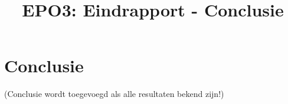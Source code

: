 \documentclass{scrartcl} %
\author{}
\title{EPO3: Eindrapport - Conclusie}
\begin{document}
\chapter{Conclusie}
\label{ch:conclusie}

(Conclusie wordt toegevoegd als alle resultaten bekend zijn!)
\end{document}
